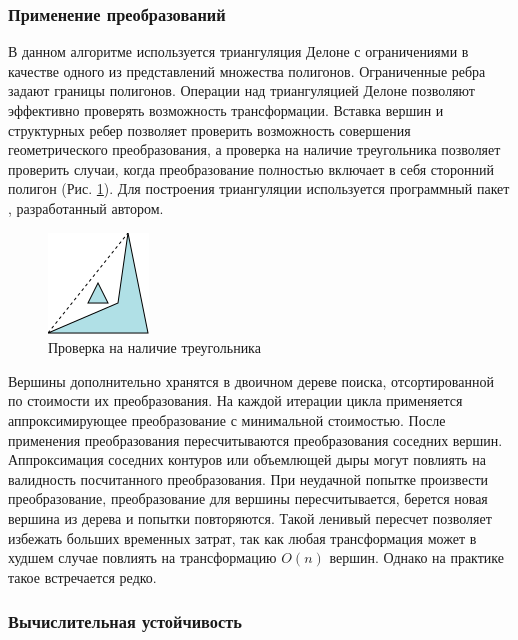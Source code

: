 \documentclass{fefu_thesis/cls/fefu}
\begin{document}
    \subsubsection{Применение преобразований}

    В данном алгоритме используется триангуляция Делоне с ограничениями в качестве одного из представлений множества полигонов. Ограниченные ребра задают границы полигонов. Операции над триангуляцией Делоне позволяют эффективно проверять возможность трансформации. Вставка вершин и структурных ребер позволяет проверить возможность совершения геометрического преобразования, а проверка на наличие треугольника  позволяет проверить случаи, когда преобразование полностью включает в себя сторонний полигон (Рис. \ref{TriangleExistenceCheck}). Для построения триангуляции используется программный пакет \cite{Terekhov}, разработанный автором.

    \begin{figure}[H]
        \centering
        \includegraphics[scale=1]{images/triangle_existance_check.png}
        \caption{Проверка на наличие треугольника}
        \label{TriangleExistenceCheck}
    \end{figure}

    Вершины дополнительно хранятся в двоичном дереве поиска, отсортированной по стоимости их преобразования. На каждой итерации цикла применяется аппроксимирующее преобразование с минимальной стоимостью. После применения преобразования пересчитываются преобразования соседних вершин. Аппроксимация соседних контуров или объемлющей дыры могут повлиять на валидность посчитанного преобразования. При неудачной попытке произвести преобразование, преобразование для вершины пересчитывается, берется новая вершина из дерева и попытки повторяются. Такой ленивый пересчет позволяет избежать больших временных затрат, так как любая трансформация может в худшем случае повлиять на трансформацию $O\left(n\right)$ вершин. Однако на практике такое встречается редко.

    \subsubsection{Вычислительная устойчивость}
\end{document}
